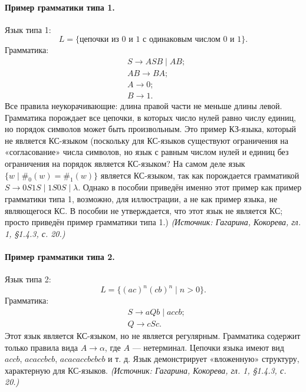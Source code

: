 \documentclass[a4paper,12pt]{article}
\begin{document}
\paragraph{Пример грамматики типа 1.}
Язык типа 1:
\[
L=\{\text{цепочки из }0\text{ и }1\text{ с одинаковым числом }0\text{ и }1\}.
\]
Грамматика:
\[
\begin{aligned}
& S\to ASB\mid AB;\\
& AB\to BA;\\
& A\to0;\\
& B\to1.
\end{aligned}
\]
Все правила неукорачивающие: длина правой части не меньше длины левой. Грамматика порождает все цепочки, в которых число нулей равно числу единиц, но порядок символов может быть произвольным. Это пример КЗ-языка, который не является КС-языком (поскольку для КС-языков существуют ограничения на «согласование» числа символов, но язык с равным числом нулей и единиц без ограничения на порядок является КС-языком? На самом деле язык \(\{w\mid \#_0(w)=\#_1(w)\}\) является КС-языком, так как порождается грамматикой \(S\to 0S1S\mid 1S0S\mid\lambda\). Однако в пособии приведён именно этот пример как пример грамматики типа 1, возможно, для иллюстрации, а не как пример языка, не являющегося КС. В пособии не утверждается, что этот язык не является КС; просто приведён пример грамматики типа 1.)
\textit{(Источник: Гагарина, Кокорева, гл. 1, §1.4.3, с. 20.)}

\paragraph{Пример грамматики типа 2.}
Язык типа 2:
\[
L=\{(ac)^n(cb)^n\mid n>0\}.
\]
Грамматика:
\[
\begin{aligned}
& S\to aQb\mid accb;\\
& Q\to cSc.
\end{aligned}
\]
Этот язык является КС-языком, но не является регулярным. Грамматика содержит только правила вида \(A\to\alpha\), где \(A\) — нетерминал. Цепочки языка имеют вид \(ac cb\), \(ac ac cb cb\), \(ac ac ac cb cb cb\) и т. д. Язык демонстрирует «вложенную» структуру, характерную для КС-языков.
\textit{(Источник: Гагарина, Кокорева, гл. 1, §1.4.3, с. 20.)}
\end{document}
